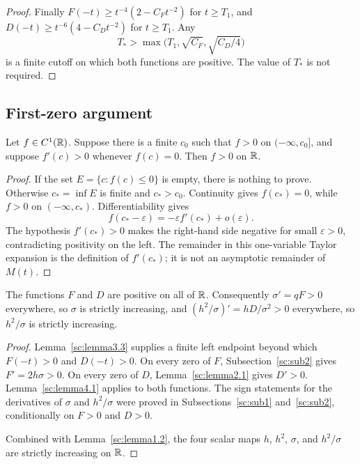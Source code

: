 \begin{proof}
Finally \(F(-t)\ge t^{-4}(2-C_F t^{-2})\) for \(t\ge T_1\), and \(D(-t)\ge t^{-6}(4-C_D t^{-2})\) for \(t\ge T_1\). Any
\[
T_*>\max\bigl(T_1,\sqrt{C_F},\sqrt{C_D/4}\bigr)
\]
is a finite cutoff on which both functions are positive. The value of \(T_*\) is not required.

\end{proof}

\subsection{First-zero argument}\label{sc:sub4}

\begin{lemma}\label{sc:lemma4.1}
Let \(f\in C^1(\mathbb R)\). Suppose there is a finite \(c_0\) such that \(f>0\) on \((-\infty,c_0]\), and suppose \(f'(c)>0\) whenever \(f(c)=0\). Then \(f>0\) on \(\mathbb R\).

\end{lemma}
\begin{proof}
If the set \(E=\{c:f(c)\le 0\}\) is empty, there is nothing to prove. Otherwise \(c_*=\inf E\) is finite and \(c_*>c_0\). Continuity gives \(f(c_*)=0\), while \(f>0\) on \((-\infty,c_*)\). Differentiability gives
\[
f(c_*-\varepsilon)=-\varepsilon f'(c_*)+o(\varepsilon).
\]
The hypothesis \(f'(c_*)>0\) makes the right-hand side negative for small \(\varepsilon>0\), contradicting positivity on the left. The remainder in this one-variable Taylor expansion is the definition of \(f'(c_*)\); it is not an asymptotic remainder of \(M(t)\).

\end{proof}

\begin{theorem}\label{sc:theorem4.2}
The functions \(F\) and \(D\) are positive on all of \(\mathbb R\). Consequently \(\sigma'=qF>0\) everywhere, so \(\sigma\) is strictly increasing, and \((h^2/\sigma)'=hD/\sigma^2>0\) everywhere, so \(h^2/\sigma\) is strictly increasing.

\end{theorem}
\begin{proof}
Lemma~\ref{sc:lemma3.3} supplies a finite left endpoint beyond which \(F(-t)>0\) and \(D(-t)>0\). On every zero of \(F\), Subsection~\ref{sc:sub2} gives \(F'=2h\sigma>0\). On every zero of \(D\), Lemma~\ref{sc:lemma2.1} gives \(D'>0\). Lemma~\ref{sc:lemma4.1} applies to both functions. The sign statements for the derivatives of \(\sigma\) and \(h^2/\sigma\) were proved in Subsections~\ref{sc:sub1} and~\ref{sc:sub2}, conditionally on \(F>0\) and \(D>0\).

Combined with Lemma~\ref{sc:lemma1.2}, the four scalar maps \(h\), \(h^2\), \(\sigma\), and \(h^2/\sigma\) are strictly increasing on \(\mathbb R\).

\end{proof}

